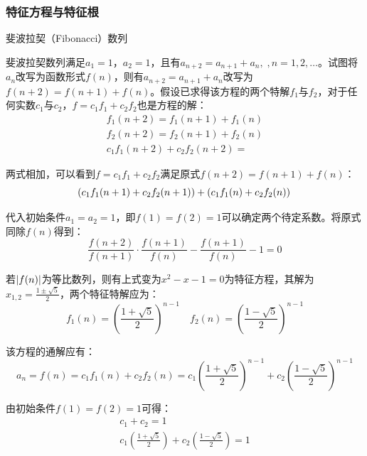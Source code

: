 \documentclass[11pt]{article}
\begin{document}
\subsubsection*{特征方程与特征根}

\begin{example}
    斐波拉契（Fibonacci）数列

    斐波拉契数列满足$a_1=1$，$a_2=1$，且有$a_{n+2} = a_{n+1} + a_{n},\;,n=1,2,\dots$。试图将$a_n$改写为函数形式$f(n)$，则有$a_{n+2} = a_{n+1} + a_{n}$改写为$f(n+2) = f(n+1) + f(n)$。假设已求得该方程的两个特解$f_1$与$f_2$，对于任何实数$c_1$与$c_2$，$f= c_1 f_1 + c_2 f_2$也是方程的解：
    \begin{gather*}
        f_1(n+2) = f_1(n+1) + f_1(n) \\
        f_2(n+2) = f_2(n+1) + f_2(n) \\
        c_1 f_1(n+2) + c_2 f_2(n+2) = 
    \end{gather*}

    两式相加，可以看到$f = c_1 f_1 + c_2 f_2$满足原式$f(n+2) = f(n+1) + f(n)$：
    \begin{equation*}
        \left( c_1 f_1(n+1) + c_2 f_2(n+1) \right) + \left( c_1 f_1(n)  + c_2 f_2(n) \right) \\
    \end{equation*}

    代入初始条件$a_1=a_2=1$，即$f(1)=f(2)=1$可以确定两个待定系数。将原式同除$f(n)$得到：
    \begin{equation*}
        \frac{f(n+2)}{f(n+1)} \cdot \frac{f(n+1)}{f(n)} - \frac{f(n+1)}{f(n)} - 1 = 0
    \end{equation*}

    若$\left\lvert f(n)\right\rvert$为等比数列，则有上式变为$x^2-x-1=0$为特征方程，其解为$x_{1,2} = \frac{1\pm \sqrt{5}}{2}$，两个特征特解应为：
    \begin{equation*}
        f_1(n) = \left(\frac{1+\sqrt{5}}{2}\right)^{n-1} \quad
        f_2(n) = \left(\frac{1-\sqrt{5}}{2}\right)^{n-1}
    \end{equation*}
   
    该方程的通解应有：
    \begin{equation*}
        a_n = f(n) = c_1 f_1(n) + c_2 f_2(n) = 
        c_1 \left(\frac{1+\sqrt{5}}{2} \right)^{n-1} + c_2 \left( \frac{1-\sqrt{5}}{2} \right)^{n-1}
    \end{equation*}
    
    由初始条件$f(1)=f(2)=1$可得：
    \begin{gather*}
        c_1 + c_2 = 1 \\
        c_1 \left(\frac{1+\sqrt{5}}{2} \right) + c_2 \left( \frac{1-\sqrt{5}}{2} \right) = 1
    \end{gather*}
    

\end{example}
\end{document}
